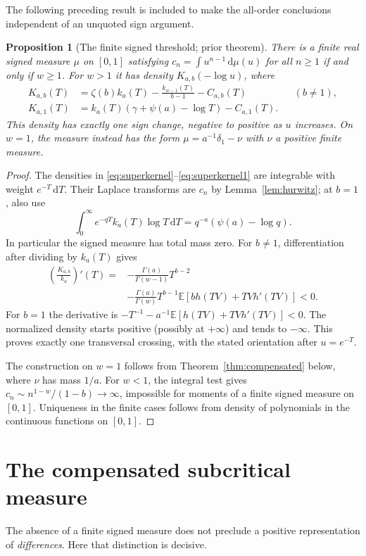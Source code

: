\documentclass[11pt]{article}
\numberwithin{equation}{section}
\newtheorem{proposition}[theorem]{Proposition}
\theoremstyle{definition}
\theoremstyle{remark}
\newcommand{\dd}{\,\mathrm d}
\newcommand{\E}{\mathbb E}
\begin{document}
The following preceding result is included to make the all-order
conclusions independent of an unquoted sign argument.
\begin{proposition}[The finite signed threshold; prior theorem]
\label{prop:signedthreshold}
There is a finite real signed measure $\mu$ on $[0,1]$ satisfying
$c_n=\int u^{n-1}\dd\mu(u)$ for all $n\ge1$ if and only if $w\ge1$.
For $w>1$ it has density $K_{a,b}(-\log u)$, where
\begin{align}
 K_{a,b}(T)&=\zeta(b)k_a(T)-\frac{k_{w-1}(T)}{b-1}-C_{a,b}(T)
 &&(b\ne1),\label{eq:superkernel}\\
 K_{a,1}(T)&=k_a(T)(\gamma+\psi(a)-\log T)-C_{a,1}(T).
 \label{eq:superkernel1}
\end{align}
This density has exactly one sign change, negative to positive as $u$
increases. On $w=1$, the measure instead has the form
$\mu=a^{-1}\delta_1-\nu$ with $\nu$ a positive finite measure.
\end{proposition}
\begin{proof}
The densities in \eqref{eq:superkernel}--\eqref{eq:superkernel1} are
integrable with weight $e^{-T}\dd T$. Their Laplace transforms are
$c_n$ by Lemma~\ref{lem:hurwitz}; at $b=1$, also use
\[
 \int_0^\infty e^{-qT}k_a(T)\log T\dd T
 =q^{-a}(\psi(a)-\log q).
\]
In particular the signed measure has total mass zero.
For $b\ne1$, differentiation after dividing by $k_a(T)$ gives
\begin{align*}
 \left(\frac{K_{a,b}}{k_a}\right)'(T)
 ={}&-\frac{\Gamma(a)}{\Gamma(w-1)}T^{b-2}\\
 &-\frac{\Gamma(a)}{\Gamma(w)}T^{b-1}
       \E[b h(TV)+TVh'(TV)]<0.
\end{align*}
For $b=1$ the derivative is
$-T^{-1}-a^{-1}\E[h(TV)+TVh'(TV)]<0$.
The normalized density starts positive (possibly at $+\infty$) and
tends to $-\infty$. This proves exactly one transversal crossing, with
the stated orientation after $u=e^{-T}$.

The construction on $w=1$ follows from
Theorem~\ref{thm:compensated} below, where $\nu$ has mass $1/a$.
For $w<1$, the integral test gives
$c_n\sim n^{1-w}/(1-b)\to\infty$, impossible for moments of a finite
signed measure on $[0,1]$. Uniqueness in the finite cases follows from
density of polynomials in the continuous functions on $[0,1]$.
\end{proof}

\section{The compensated subcritical measure}
\label{sec:compensated}
The absence of a finite signed measure does not preclude a positive
representation of \emph{differences}. Here that distinction is decisive.
\end{document}
